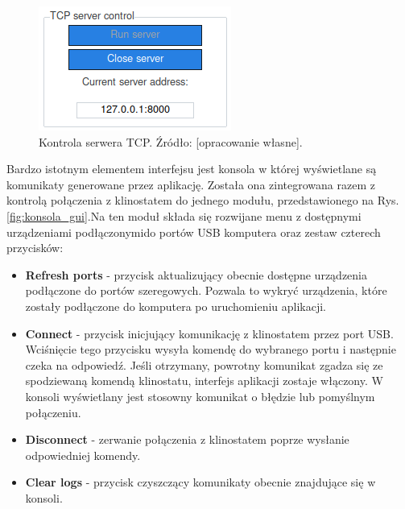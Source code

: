 \begin{figure}[h]
	
	\centering
	\includegraphics[scale=2]{serwer}
	\caption{Kontrola serwera TCP. Źródło: [opracowanie własne].} 
	\label{fig:tcp_gui}
	
\end{figure}

Bardzo istotnym elementem interfejsu jest konsola w której wyświetlane są komunikaty generowane przez aplikację. Została ona zintegrowana razem z kontrolą połączenia z klinostatem do jednego modułu, przedstawionego na Rys. \ref{fig:konsola_gui}.\linebreak Na ten moduł składa się rozwijane menu z dostępnymi urządzeniami podłączonymi\linebreak do portów USB komputera oraz zestaw czterech przycisków:
\begin{itemize}
	\item \textbf{Refresh ports} - przycisk aktualizujący obecnie dostępne urządzenia podłączone do portów szeregowych. Pozwala to wykryć urządzenia, które zostały podłączone do komputera po uruchomieniu aplikacji.
	\item \textbf{Connect} - przycisk inicjujący komunikację z klinostatem przez port USB. Wciśnięcie tego przycisku wysyła komendę do wybranego portu i następnie czeka na odpowiedź. Jeśli otrzymany, powrotny komunikat zgadza się ze spodziewaną komendą klinostatu, interfejs aplikacji zostaje włączony. W konsoli wyświetlany jest stosowny komunikat o błędzie lub pomyślnym połączeniu.
	\item \textbf{Disconnect} - zerwanie połączenia z klinostatem poprze wysłanie odpowiedniej komendy.
	\item \textbf{Clear logs} - przycisk czyszczący komunikaty obecnie znajdujące się w konsoli.
	
\end{itemize}

